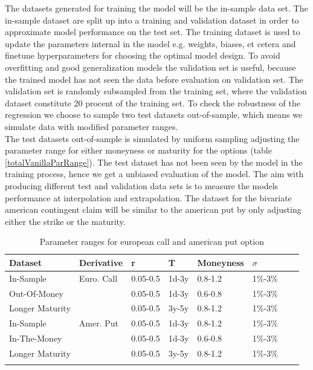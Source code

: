 The datasets generated for training the model will be the in-sample data set. The in-sample dataset are split up into a training and validation dataset in order to approximate model performance on the test set. The training dataset is used to update the parameters internal in the model e.g. weights, biases, et cetera and finetune hyperparameters for choosing the optimal model design. To avoid overfitting and good generalization models the validation set is useful, because the trained model has not seen the data before evaluation on validation set. The validation set is randomly subsampled from the training set, where the validation dataset constitute 20 procent of the training set. To check the robustness of the regression we choose to sample two test datasets out-of-sample, which means we simulate data with modified parameter ranges. \\

The test datasets out-of-sample is simulated by uniform sampling adjusting the parameter range for either moneyness or maturity for the options (table \ref{totalVanillaParRange}). The test dataset has not been seen by the model in the training process, hence we get a unbiased evaluation of the model. The aim with producing different test and validation data sets is to measure the models performance at interpolation and extrapolation. The dataset for the bivariate american contingent claim will be similar to the american put by only adjusting either the strike or the maturity.\\

\begin{table}[th]
\caption{Parameter ranges for european call and american put option}
\label{tab:totalVanillaParRange}
\centering
\begin{tabular}{l l l l l l l l }
\toprule
\textbf{Dataset} & Derivative  & \textbf{r} & \textbf{T} & \textbf{Moneyness} & \textbf{$\sigma$} \\
\midrule
In-Sample & Euro. Call & 0.05-0.5 & 1d-3y & 0.8-1.2 & 1\%-3\%\\ 
Out-Of-Money & & 0.05-0.5 & 1d-3y & 0.6-0.8 & 1\%-3\%\\
Longer Maturity & & 0.05-0.5 & 3y-5y & 0.8-1.2 & 1\%-3\%\\
In-Sample & Amer. Put & 0.05-0.5 & 1d-3y & 0.8-1.2 & 1\%-3\%\\ 
In-The-Money & & 0.05-0.5 & 1d-3y & 0.6-0.8 & 1\%-3\%\\
Longer Maturity & & 0.05-0.5 & 3y-5y & 0.8-1.2 & 1\%-3\%\\
\bottomrule\\
\end{tabular}
\end{table}

